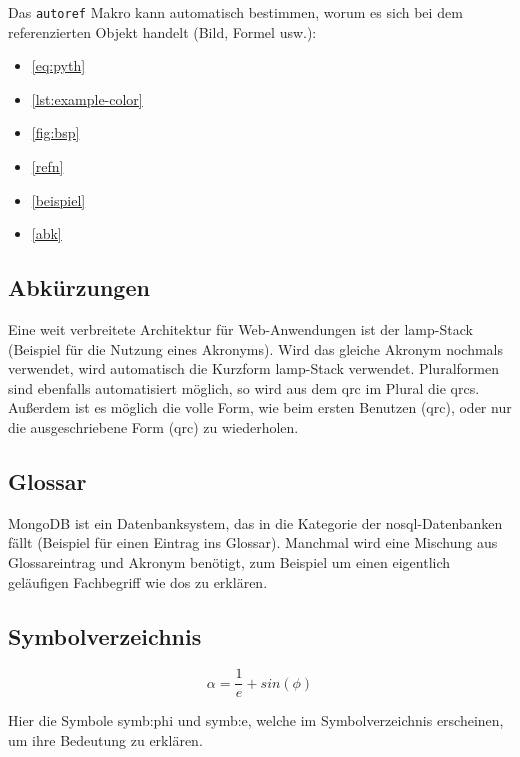 Das \texttt{autoref} Makro kann automatisch bestimmen, worum es sich bei dem referenzierten Objekt handelt (Bild, Formel usw.):

\begin{itemize}
  \item \autoref{eq:pyth}
  \item \autoref{lst:example-color}
  \item \autoref{fig:bsp}
  \item \autoref{refn}
  \item \autoref{beispiel}
  \item \autoref{abk}
\end{itemize}

\subsection{Abkürzungen}\label{abk}

Eine weit verbreitete Architektur für Web-Anwendungen ist der \gls{lamp}-Stack (Beispiel für die Nutzung eines Akronyms).
Wird das gleiche Akronym nochmals verwendet, wird automatisch die Kurzform \gls{lamp}-Stack verwendet.
Pluralformen sind ebenfalls automatisiert möglich, so wird aus dem \gls{qrc} im Plural die \glspl{qrc}.
Außerdem ist es möglich die volle Form, wie beim ersten Benutzen (\acrfull{qrc}), oder nur die ausgeschriebene Form (\acrlong{qrc}) zu wiederholen.

\subsection{Glossar}

MongoDB ist ein Datenbanksystem, das in die Kategorie der \gls{nosql}-Datenbanken fällt (Beispiel für einen Eintrag ins Glossar).
Manchmal wird eine Mischung aus Glossareintrag und Akronym benötigt, zum Beispiel um einen eigentlich geläufigen Fachbegriff wie \gls{dos} zu erklären.

\subsection{Symbolverzeichnis}

\begin{equation}
  \alpha = \frac{1}{e} + sin(\phi)
\end{equation}

Hier die Symbole \gls{symb:phi} und \gls{symb:e}, welche im Symbolverzeichnis erscheinen, um ihre Bedeutung zu erklären.

